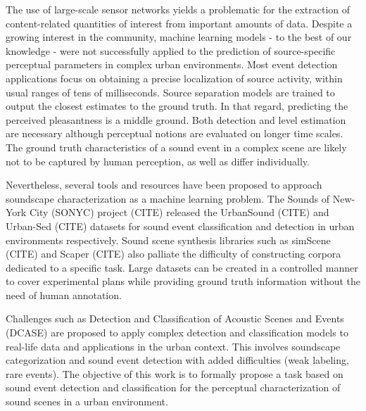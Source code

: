 \documentclass{article}
\begin{document}
\begin{sloppy}
The use of large-scale sensor networks yields a problematic for the extraction of content-related quantities of interest from important amounts of data. Despite a growing interest in the community, machine learning models - to the best of our knowledge - were not successfully applied to the prediction of source-specific perceptual parameters in complex urban environments. Most event detection applications focus on obtaining a precise localization of source activity, within usual ranges of tens of milliseconds. Source separation models are trained to output the closest estimates to the ground truth. In that regard, predicting the perceived pleasantness is a middle ground. Both detection and level estimation are necessary although perceptual notions are evaluated on longer time scales. The ground truth characteristics of a sound event in a complex scene are likely not to be captured by human perception, as well as differ individually.

Nevertheless, several tools and resources have been proposed to approach soundscape characterization as a machine learning problem. The Sounds of New-York City (SONYC) project (CITE) released the UrbanSound (CITE) and Urban-Sed (CITE) datasets for sound event classification and detection in urban environments respectively. Sound scene synthesis libraries such as simScene (CITE) and Scaper (CITE) also palliate the difficulty of constructing corpora dedicated to a specific task. Large datasets can be created in a controlled manner to cover experimental plans while providing ground truth information without the need of human annotation.

Challenges such as Detection and Classification of Acoustic Scenes and Events (DCASE) are proposed to apply complex detection and classification models to real-life data and applications in the urban context. This involves soundscape categorization and sound event detection with added difficulties (weak labeling, rare events). The objective of this work is to formally propose a task based on sound event detection and classification for the perceptual characterization of sound scenes in a urban environment.

\clearpage


\end{sloppy}
\end{document}
